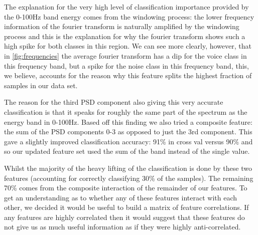 \documentclass[ %
                    author={Sam Phippen},
                supervisor={Dr. Rafal Bogacz},
                     title={Real time voice activity detectors in noisy personal computing environments},
                  subtitle={},
                    degree={MEng},
                      year={2012} ]{thesis}
\begin{document}
The explanation for the very high level of classification importance provided
by the 0-100Hz band energy comes from the windowing process: the lower
frequency information of the fourier transform is naturally amplified by the
windowing process and this is the explanation for why the fourier transform
shows such a high spike for both classes in this region. We can see more
clearly, however, that in \ref{fig:frequencies} the average fourier transform
has a dip for the voice class in this frequency band, but a spike for the noise
class in this frequency band, this, we believe, accounts for the reason why
this feature splits the highest fraction of samples in our data set.

The reason for the third PSD component also giving this very accurate
classification is that it speaks for roughly the same part of the spectrum as
the energy band in 0-100Hz. Based off this finding we also tried a composite
feature: the sum of the PSD components 0-3 as opposed to just the 3rd
component. This gave a slightly improved classification accuracy: 91\% in
cross val versus 90\% and so our updated feature set used the sum of the band
instead of the single value.

Whilst the majority of the heavy lifting of the classification is done by these
two features (accounting for correctly classifying 30\% of the samples). The
remaining 70\% comes from the composite interaction of the remainder of our
features. To get an understanding as to whether any of these features interact
with each other, we decided it would be useful to build a matrix of feature
correlations. If any features are highly correlated then it would suggest that
these features do not give us as much useful information as if they were highly
anti-correlated.
\end{document}
